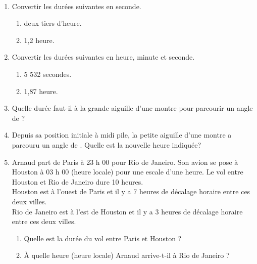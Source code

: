 \bigskip


\begin{exercice}[CRPE 2006 G4] %
\ \\ [-10mm]
   \begin{enumerate}
      \item Convertir les durées suivantes en seconde.
         \begin{enumerate}
            \item deux tiers d'heure.
            \item 1,2 heure.
         \end{enumerate}
      \item Convertir les durées suivantes en heure, minute et seconde.
         \begin{enumerate}
            \item 5 532 secondes.
            \item 1,87 heure.
         \end{enumerate}
      \item Quelle durée faut-il à la grande aiguille d'une montre pour parcourir un angle de  ?
      \item Depuis sa position initiale à midi pile, la petite aiguille d'une montre a parcouru un angle de . Quelle est la nouvelle heure indiquée?
      \item Arnaud part de Paris à 23 h 00 pour Rio de Janeiro. Son avion se pose à Houston à 03 h 00 (heure locale) pour une escale d'une heure. Le vol entre Houston et Rio de Janeiro dure 10 heures. \\
         Houston est à l'ouest de Paris et il y a 7 heures de décalage horaire entre ces deux villes. \\
         Rio de Janeiro est à l'est de Houston et il y a 3 heures de décalage horaire entre ces deux villes.
         \begin{enumerate}
            \item Quelle est la durée du vol entre Paris et Houston ?
            \item À quelle heure (heure locale) Arnaud arrive-t-il à Rio de Janeiro ?
         \end{enumerate}
   \end{enumerate}
\end{exercice}

